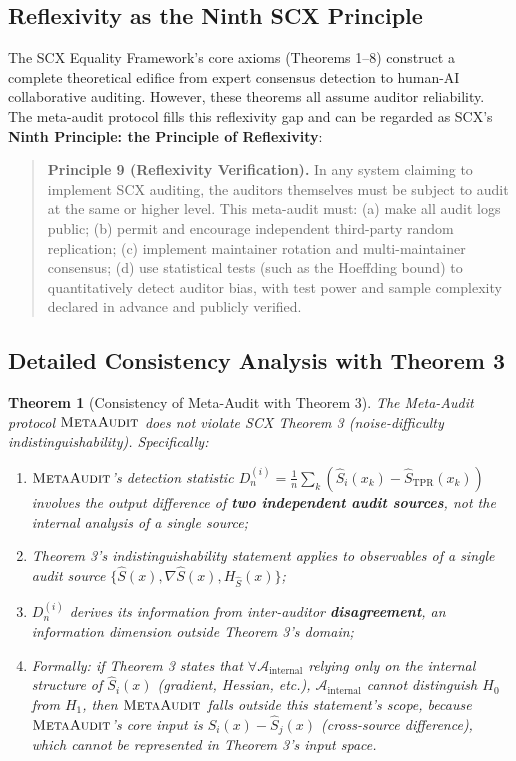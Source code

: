 \documentclass[11pt,a4paper]{article}
\newtheorem{theorem}{Theorem}[section]
\theoremstyle{definition}
\newcommand{\MetaAudit}{\textsc{MetaAudit}}
\begin{document}
\subsection{Reflexivity as the Ninth SCX Principle}

\noindent
The SCX Equality Framework's core axioms (Theorems 1--8) construct a complete theoretical edifice from expert consensus detection to human-AI collaborative auditing. However, these theorems all assume auditor reliability. The meta-audit protocol fills this reflexivity gap and can be regarded as SCX's \textbf{Ninth Principle: the Principle of Reflexivity}:

\begin{quote}
\textbf{Principle 9 (Reflexivity Verification).} In any system claiming to implement SCX auditing, the auditors themselves must be subject to audit at the same or higher level. This meta-audit must: (a) make all audit logs public; (b) permit and encourage independent third-party random replication; (c) implement maintainer rotation and multi-maintainer consensus; (d) use statistical tests (such as the Hoeffding bound) to quantitatively detect auditor bias, with test power and sample complexity declared in advance and publicly verified.
\end{quote}

\subsection{Detailed Consistency Analysis with Theorem 3}

\begin{theorem}[Consistency of Meta-Audit with Theorem 3]
\label{thm:consistency_t3}
The Meta-Audit protocol $\MetaAudit$ does not violate SCX Theorem 3 (noise-difficulty indistinguishability). Specifically:
\begin{enumerate}[label=(\alph*), leftmargin=*]
    \item $\MetaAudit$'s detection statistic $D_n^{(i)} = \frac{1}{n}\sum_{k}(\hat{S}_i(x_k) - \hat{S}_{\text{TPR}}(x_k))$ involves the output difference of \textbf{two independent audit sources}, not the internal analysis of a single source;
    \item Theorem 3's indistinguishability statement applies to observables of a single audit source $\{\hat{S}(x), \nabla\hat{S}(x), H_{\hat{S}}(x)\}$;
    \item $D_n^{(i)}$ derives its information from inter-auditor \textbf{disagreement}, an information dimension outside Theorem 3's domain;
    \item Formally: if Theorem 3 states that $\forall \mathcal{A}_{\text{internal}}$ relying only on the internal structure of $\hat{S}_i(x)$ (gradient, Hessian, etc.), $\mathcal{A}_{\text{internal}}$ cannot distinguish $H_0$ from $H_1$, then $\MetaAudit$ falls outside this statement's scope, because $\MetaAudit$'s core input is $\hat{S}_i(x) - \hat{S}_j(x)$ (cross-source difference), which cannot be represented in Theorem 3's input space.
\end{enumerate}
\end{theorem}
\end{document}
